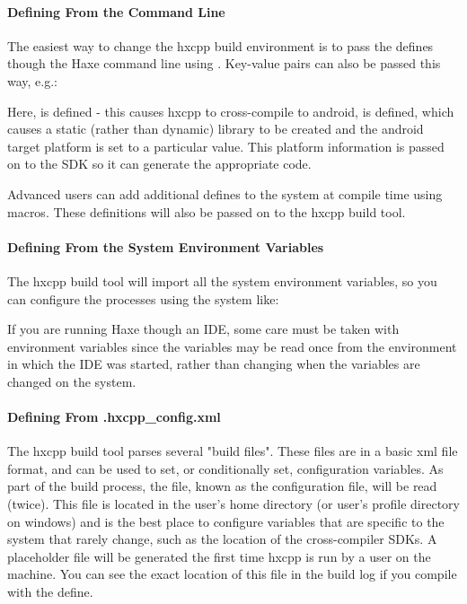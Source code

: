 \paragraph{Defining From the Command Line}
The easiest way to change the hxcpp build environment is to pass the defines though the Haxe command line using .  Key-value pairs can also be passed this way, e.g.:


Here,  is defined - this causes hxcpp to cross-compile to android,  is defined, which causes a static (rather than dynamic) library to be created and the android target platform is set to a particular value.  This platform information is passed on to the SDK so it can generate the appropriate code.

Advanced users can add additional defines to the system at compile time using macros.  These definitions will also be passed on to the hxcpp build tool.

\paragraph{Defining From the System Environment Variables}
The hxcpp build tool will import all the system environment variables, so you can configure the processes using the system like:


If you are running Haxe though an IDE, some care must be taken with environment variables since the variables may be read once from the environment in which the IDE was started, rather than changing when the variables are changed on the system.

\paragraph{Defining From .hxcpp_config.xml}
The hxcpp build tool parses several "build files".  These files are in a basic xml file format, and can be used to set, or conditionally set, configuration variables.  As part of the build process, the  file, known as the configuration file, will be read (twice).  This file is located in the user's home directory (or user's profile directory on windows) and is the best place to configure variables that are specific to the system that rarely change, such as the location of the cross-compiler SDKs.  A placeholder file will be generated the first time hxcpp is run by a user on the machine.  You can see the exact location of this file in the build log if you compile with the  define.

